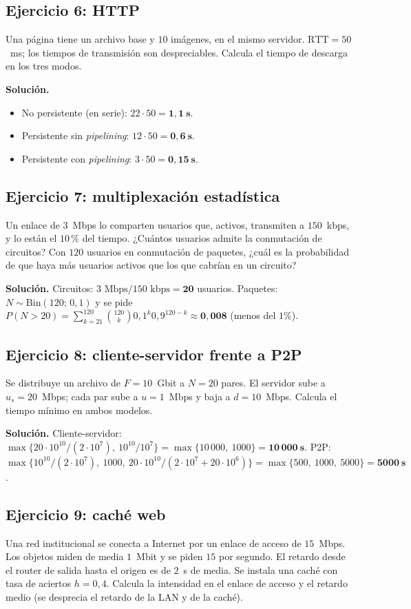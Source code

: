\documentclass[11pt,a4paper]{article}
\begin{document}
\subsection*{Ejercicio 6: HTTP}
Una página tiene un archivo base y $10$ imágenes, en el mismo servidor. $\text{RTT}=50$~ms; los tiempos de transmisión son despreciables. Calcula el tiempo de descarga en los tres modos.

\textbf{Solución.}
\begin{itemize}
  \item No persistente (en serie): $22\cdot50=\mathbf{1{,}1~s}$.
  \item Persistente sin \emph{pipelining}: $12\cdot50=\mathbf{0{,}6~s}$.
  \item Persistente con \emph{pipelining}: $3\cdot50=\mathbf{0{,}15~s}$.
\end{itemize}

\subsection*{Ejercicio 7: multiplexación estadística}
Un enlace de $3$~Mbps lo comparten usuarios que, activos, transmiten a $150$~kbps, y lo están el $10$\,\% del tiempo. ¿Cuántos usuarios admite la conmutación de circuitos? Con $120$ usuarios en conmutación de paquetes, ¿cuál es la probabilidad de que haya más usuarios activos que los que cabrían en un circuito?

\textbf{Solución.} Circuitos: $3\text{ Mbps}/150\text{ kbps}=\mathbf{20}$ usuarios. Paquetes: $N\sim\text{Bin}(120;\,0{,}1)$ y se pide $P(N>20)=\sum_{k=21}^{120}\binom{120}{k}0{,}1^{k}0{,}9^{120-k}\approx\mathbf{0{,}008}$ (menos del $1\%$).

\subsection*{Ejercicio 8: cliente-servidor frente a P2P}
Se distribuye un archivo de $F=10$~Gbit a $N=20$ pares. El servidor sube a $u_s=20$~Mbps; cada par sube a $u=1$~Mbps y baja a $d=10$~Mbps. Calcula el tiempo mínimo en ambos modelos.

\textbf{Solución.} Cliente-servidor: $\max\{20\cdot10^{10}/(2\cdot10^{7}),\ 10^{10}/10^{7}\}=\max\{10\,000,\ 1000\}=\mathbf{10\,000~s}$.
P2P: $\max\{10^{10}/(2\cdot10^{7}),\ 1000,\ 20\cdot10^{10}/(2\cdot10^{7}+20\cdot10^{6})\}=\max\{500,\ 1000,\ 5000\}=\mathbf{5000~s}$.

\subsection*{Ejercicio 9: caché web}
Una red institucional se conecta a Internet por un enlace de acceso de $15$~Mbps. Los objetos miden de media $1$~Mbit y se piden $15$ por segundo. El retardo desde el router de salida hasta el origen es de $2$~s de media. Se instala una caché con tasa de aciertos $h=0{,}4$. Calcula la intensidad en el enlace de acceso y el retardo medio (se desprecia el retardo de la LAN y de la caché).
\end{document}
